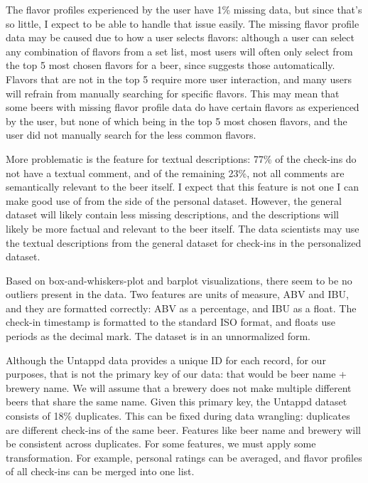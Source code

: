 \documentclass[sigconf, natbib=true]{acmart}
\begin{document}
The flavor profiles experienced by the user have 1\% missing data, but since that's so little, I expect to be able to handle that issue easily.
The missing flavor profile data may be caused due to how a user selects flavors: although a user can select any combination of flavors from a set list, most users will often only select from the top 5 most chosen flavors for a beer, since \citeauthor{untappd} suggests those automatically.
Flavors that are not in the top 5 require more user interaction, and many users will refrain from manually searching for specific flavors.
This may mean that some beers with missing flavor profile data do have certain flavors as experienced by the user, but none of which being in the top 5 most chosen flavors, and the user did not manually search for the less common flavors.

More problematic is the feature for textual descriptions: 77\% of the check-ins do not have a textual comment, and of the remaining 23\%, not all comments are semantically relevant to the beer itself.
I expect that this feature is not one I can make good use of from the side of the personal dataset.
However, the general dataset will likely contain less missing descriptions, and the descriptions will likely be more factual and relevant to the beer itself.
The data scientists may use the textual descriptions from the general dataset for check-ins in the personalized dataset.

Based on box-and-whiskers-plot and barplot visualizations, there seem to be no outliers present in the data.
Two features are units of measure, ABV and IBU, and they are formatted correctly: ABV as a percentage, and IBU as a float.
The check-in timestamp is formatted to the standard ISO format, and floats use periods as the decimal mark.
The dataset is in an unnormalized form.

Although the Untappd data provides a unique ID for each record, for our purposes, that is not the primary key of our data: that would be beer name + brewery name.
We will assume that a brewery does not make multiple different beers that share the same name.
Given this primary key, the Untappd dataset consists of 18\% duplicates.
This can be fixed during data wrangling: duplicates are different check-ins of the same beer.
Features like beer name and brewery will be consistent across duplicates.
For some features, we must apply some transformation. 
For example, personal ratings can be averaged, and flavor profiles of all check-ins can be merged into one list.
\end{document}
